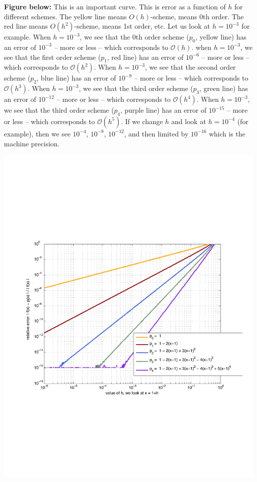 \documentclass[pdftex,11pt]{article}
\begin{document}
\textbf{Figure below:} This is an important curve. This is error as a function
of $h$ for different schemes. The yellow line means $O(h)$-scheme, means 0th
order. The red line means $O(h^2)$-scheme, means 1st order, etc. Let us look at
$h=10^{-3}$ for example. When $h=10^{-3}$, we see that the 0th order scheme ($p_0$,
yellow line) has an error of $10^{-3}$ -- more or less -- which corresponds to
$\mathcal{O}(h)$.  when $h=10^{-3}$, we see that the first order scheme ($p_1$,
red line) has an error of $10^{-6}$ -- more or less -- which corresponds to
$\mathcal{O}(h^2)$.  When $h=10^{-3}$, we see that the second order scheme ($p_2$,
blue line) has an error of $10^{-9}$ -- more or less -- which corresponds to
$\mathcal{O}(h^3)$.  When $h=10^{-3}$, we see that the third order scheme ($p_3$,
green line) has an error of $10^{-12}$ -- more or less -- which corresponds to
$\mathcal{O}(h^4)$.  When $h=10^{-3}$, we see that the third order scheme ($p_4$,
purple line) has an error of $10^{-15}$ -- more or less -- which corresponds to
$\mathcal{O}(h^5)$.  If we change $h$ and look at $h=10^{-4}$ (for example), then
we see $10^{-4}$, $10^{-8}$, $10^{-12}$, and then limited by $10^{-16}$ which is the
machine precision.

\includegraphics[width=.7\textwidth]{sauer-exercise-0-5-6/EX_0_5_6_fig5}
\end{document}
